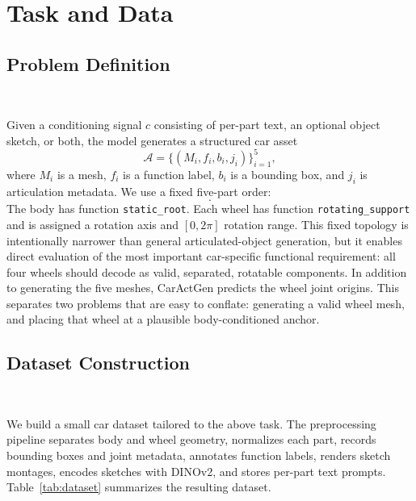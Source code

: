 \documentclass[10pt]{article}
\newcommand{\method}{CarActGen\xspace}
\begin{document}
\section{Task and Data}

\subsection{Problem Definition}

\ 

Given a conditioning signal $c$ consisting of per-part text, an optional object sketch, or both, the model generates a structured car asset
\begin{equation}
    \mathcal{A} = \{(M_i, f_i, b_i, j_i)\}_{i=1}^{5},
\end{equation}
where $M_i$ is a mesh, $f_i$ is a function label, $b_i$ is a bounding box, and $j_i$ is articulation metadata. We use a fixed five-part order:
\begin{equation}
    [\text{body}, \text{front-left wheel}, \text{front-right wheel}, \text{rear-left wheel}, \text{rear-right wheel}].
\end{equation}
The body has function \texttt{static\_root}. Each wheel has function \texttt{rotating\_support} and is assigned a rotation axis and $[0,2\pi]$ rotation range. This fixed topology is intentionally narrower than general articulated-object generation, but it enables direct evaluation of the most important car-specific functional requirement: all four wheels should decode as valid, separated, rotatable components. In addition to generating the five meshes, \method predicts the wheel joint origins. This separates two problems that are easy to conflate: generating a valid wheel mesh, and placing that wheel at a plausible body-conditioned anchor.

\subsection{Dataset Construction}

\ 

We build a small car dataset tailored to the above task. The preprocessing pipeline separates body and wheel geometry, normalizes each part, records bounding boxes and joint metadata, annotates function labels, renders sketch montages, encodes sketches with DINOv2, and stores per-part text prompts. Table~\ref{tab:dataset} summarizes the resulting dataset.
\end{document}
